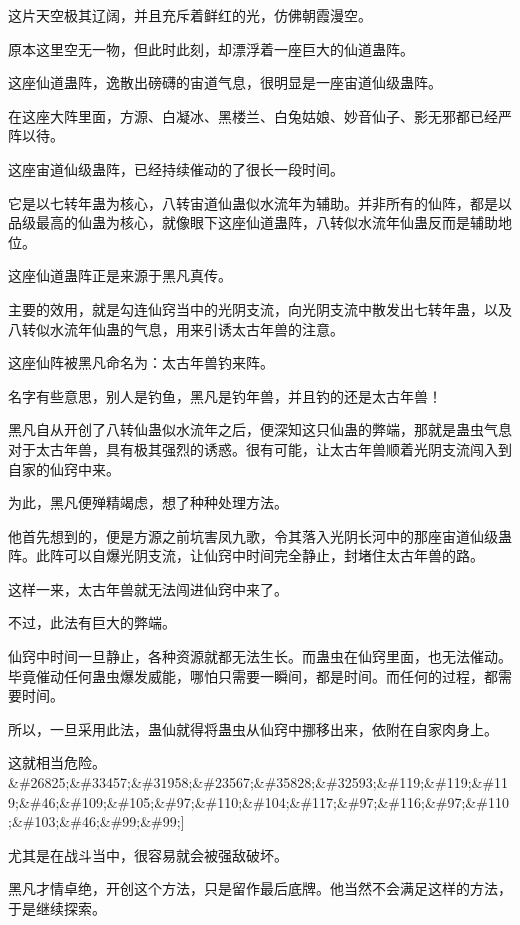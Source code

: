 
\begin{this_body}

这片天空极其辽阔，并且充斥着鲜红的光，仿佛朝霞漫空。

原本这里空无一物，但此时此刻，却漂浮着一座巨大的仙道蛊阵。

这座仙道蛊阵，逸散出磅礴的宙道气息，很明显是一座宙道仙级蛊阵。

在这座大阵里面，方源、白凝冰、黑楼兰、白兔姑娘、妙音仙子、影无邪都已经严阵以待。

这座宙道仙级蛊阵，已经持续催动的了很长一段时间。

它是以七转年蛊为核心，八转宙道仙蛊似水流年为辅助。并非所有的仙阵，都是以品级最高的仙蛊为核心，就像眼下这座仙道蛊阵，八转似水流年仙蛊反而是辅助地位。

这座仙道蛊阵正是来源于黑凡真传。

主要的效用，就是勾连仙窍当中的光阴支流，向光阴支流中散发出七转年蛊，以及八转似水流年仙蛊的气息，用来引诱太古年兽的注意。

这座仙阵被黑凡命名为：太古年兽钓来阵。

名字有些意思，别人是钓鱼，黑凡是钓年兽，并且钓的还是太古年兽！

黑凡自从开创了八转仙蛊似水流年之后，便深知这只仙蛊的弊端，那就是蛊虫气息对于太古年兽，具有极其强烈的诱惑。很有可能，让太古年兽顺着光阴支流闯入到自家的仙窍中来。

为此，黑凡便殚精竭虑，想了种种处理方法。

他首先想到的，便是方源之前坑害凤九歌，令其落入光阴长河中的那座宙道仙级蛊阵。此阵可以自爆光阴支流，让仙窍中时间完全静止，封堵住太古年兽的路。

这样一来，太古年兽就无法闯进仙窍中来了。

不过，此法有巨大的弊端。

仙窍中时间一旦静止，各种资源就都无法生长。而蛊虫在仙窍里面，也无法催动。毕竟催动任何蛊虫爆发威能，哪怕只需要一瞬间，都是时间。而任何的过程，都需要时间。

所以，一旦采用此法，蛊仙就得将蛊虫从仙窍中挪移出来，依附在自家肉身上。

这就相当危险。\&\#26825;\&\#33457;\&\#31958;\&\#23567;\&\#35828;\&\#32593;\&\#119;\&\#119;\&\#119;\&\#46;\&\#109;\&\#105;\&\#97;\&\#110;\&\#104;\&\#117;\&\#97;\&\#116;\&\#97;\&\#110;\&\#103;\&\#46;\&\#99;\&\#99;]

尤其是在战斗当中，很容易就会被强敌破坏。

黑凡才情卓绝，开创这个方法，只是留作最后底牌。他当然不会满足这样的方法，于是继续探索。


\end{this_body}
